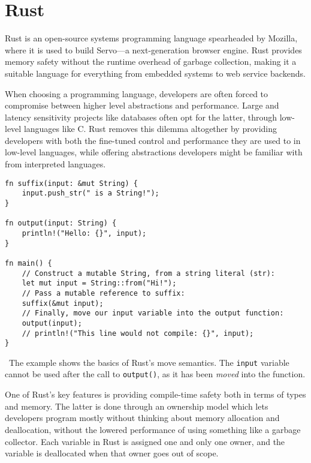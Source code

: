 \section{Rust}\label{sec:rust}

Rust is an open-source systems programming
language spearheaded by Mozilla, where it is used to build Servo---a
next-generation browser engine. Rust provides memory
safety without the runtime overhead of \eg garbage collection, making it a
suitable language for everything from embedded systems to web service backends.

When choosing a programming language, developers are often forced to compromise
between higher level abstractions and performance. Large and latency sensitivity
projects like databases often opt for the latter, through low-level languages
like C. Rust removes this dilemma altogether by providing developers with both
the fine-tuned control and performance they are used to in low-level languages,
while offering abstractions developers might be familiar with from interpreted
languages.

\begin{listing}[H]
  \begin{verbatim}
fn suffix(input: &mut String) {
    input.push_str(" is a String!");
}

fn output(input: String) {
    println!("Hello: {}", input);
}

fn main() {
    // Construct a mutable String, from a string literal (str):
    let mut input = String::from("Hi!");
    // Pass a mutable reference to suffix:
    suffix(&mut input);
    // Finally, move our input variable into the output function:
    output(input);
    // println!("This line would not compile: {}", input);
}
  \end{verbatim}
  \caption{\
    The example shows the basics of Rust's move semantics. The \texttt{input}
    variable cannot be used after the call to \texttt{output()}, as it has been
    \textit{moved} into the function.
  }
\end{listing}

One of Rust’s key features is providing compile-time safety both in terms of
types and memory. The latter is done through an ownership model which lets
developers program mostly without thinking about memory allocation and
deallocation, without the lowered performance of using something like a garbage
collector. Each variable in Rust is assigned one and only one owner, and the
variable is deallocated when that owner goes out of scope.

